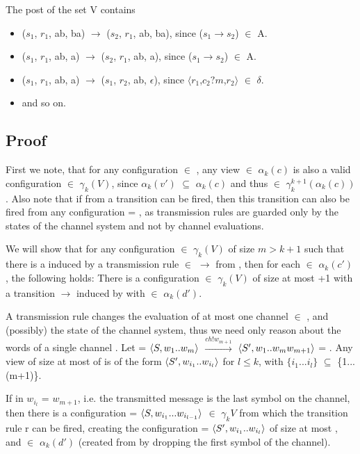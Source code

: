 The post of the set V contains
\begin{itemize}
\item
($s_1$, $r_1$, ab, ba) $\rightarrow$ ($s_2$, $r_1$, ab, ba), since ($s_1$$\rightarrow$$s_2$) $\in$ A.
\item
($s_1$, $r_1$, ab, a) $\rightarrow$ ($s_2$, $r_1$, ab, a), since ($s_1$$\rightarrow$$s_2$) $\in$ A.
\item
($s_1$, $r_1$, ab, a) $\rightarrow$ ($s_1$, $r_2$, ab, $\epsilon$), since $\langle$$r_1$,$c_2?m$,$r_2$$\rangle$ $\in$ $\delta$.
\item
and so on.
\end{itemize}

\subsection{Proof}
First we note, that for any configuration  $\in$ , any view  $\in$ $\alpha_k(c)$ is also a valid configuration  $\in$ $\gamma_k(V)$, since $\alpha_k(v')$ $\subseteq$ $\alpha_k(c)$ and thus  $\in$ $\gamma_k^{k+1}(\alpha_k(c))$. Also note that if from  a transition  can be fired, then this transition can also be fired from any configuration  = , as transmission rules are guarded only by the states of the channel system and not by channel evaluations.

We will show that for any configuration  $\in$ $\gamma_k(V)$ of size $m > k + 1$ such that there is a  induced by a transmission rule  $\in$ $\rightarrow$ from , then for each  $\in$ $\alpha_k(c')$, the following holds: There is a configuration  $\in$ $\gamma_k(V)$ of size at most +1 with a transition  $\rightarrow$  induced by  with  $\in$ $\alpha_k(d')$.

A transmission rule changes the evaluation of at most one channel  $\in$ , and (possibly) the state of the channel system, thus we need only reason about the words of a single channel .
Let  = $\langle S, w_1..w_m\rangle$ $\xrightarrow{ch!w_{m+1}}$ $\langle S', w_1..w_mw_{m+1}\rangle$ = . Any view  of size at most  of  is of the form $\langle S',w_{i_1}..w_{i_l}\rangle$ for $l \leq k$, with $\{i_1...i_l\}$ $\subseteq$ \{1...(m+1)\}.

If in  $w_{i_l}$ = $w_{m+1}$, i.e. the transmitted message is the last symbol on the channel, then there is a configuration  = $\langle S, w_{i_1}...w_{i_{l-1}}\rangle$ $\in$ $\gamma_k{V}$ from which the transition rule r can be fired, creating the configuration  = $\langle S', w_{i_1}..w_{i_l}\rangle$ of size at most , and  $\in$ $\alpha_k(d')$ (created from  by dropping the first symbol of the channel).

